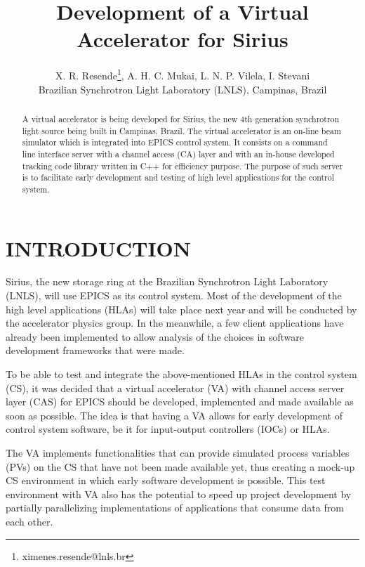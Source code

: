\documentclass[a4paper,
              ]{jacow}
\begin{document}
\title{Development of a Virtual Accelerator for Sirius}
\author{X. R. Resende\thanks{ximenes.resende@lnls.br}, A. H. C. Mukai, L. N. P. Vilela, I. Stevani \\ Brazilian Synchrotron Light Laboratory (LNLS), Campinas, Brazil}
\maketitle

\begin{abstract}
A virtual accelerator is being developed for Sirius, the new 4th generation synchrotron light source being built in Campinas, Brazil\cite{sirius_status}.
The virtual accelerator is an on-line beam simulator which is integrated into EPICS control system.
It consists on a command line interface server with a channel access (CA) layer and with an in-house developed tracking code library written in C++ for efficiency purpose.
The purpose of such server is to facilitate early development and testing of high level applications for the control system.
\end{abstract}

\section{INTRODUCTION}
Sirius, the new storage ring at the Brazilian Synchrotron Light Laboratory (LNLS), will use EPICS as its control system.
Most of the development of the high level applications (HLAs) will take place next year and will be conducted by the accelerator physics group.
In the meanwhile, a few client applications have already been implemented to allow analysis of the choices in software development frameworks\cite{sirius_hla} that were made.

To be able to test and integrate the above-mentioned HLAs in the control system (CS), it was decided that a virtual accelerator (VA) with channel access server layer (CAS) for EPICS should be developed, implemented and made available as soon as possible.
The idea is that having a VA allows for early development of control system software, be it for input-output controllers (IOCs) or HLAs.

The VA implements functionalities that can provide simulated process variables (PVs) on the CS that have not been made available yet, thus creating a mock-up CS environment in which early software development is possible.
This test environment with VA also has the potential to speed up project development by partially parallelizing implementations of applications that consume data from each other.
\end{document}
